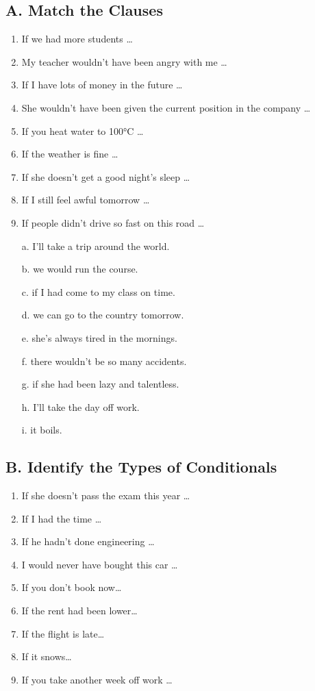 \subsection*{A. Match the Clauses}
\begin{enumerate}
      \item If we had more students …
      \item My teacher wouldn’t have been angry with me …
      \item If I have lots of money in the future …
      \item She wouldn’t have been given the current position in the company …
      \item If you heat water to 100°C …
      \item If the weather is fine …
      \item If she doesn’t get a good night’s sleep …
      \item If I still feel awful tomorrow …
      \item If people didn’t drive so fast on this road …
\end{enumerate}

\begin{enumerate}
      \item[a.] I’ll take a trip around the world.
      \item[b.] we would run the course.
      \item[c.] if I had come to my class on time.
      \item[d.] we can go to the country tomorrow.
      \item[e.] she’s always tired in the mornings.
      \item[f.] there wouldn’t be so many accidents.
      \item[g.] if she had been lazy and talentless.
      \item[h.] I’ll take the day off work.
      \item[i.] it boils.
\end{enumerate}

\subsection*{B. Identify the Types of Conditionals}

\begin{enumerate}
      \item If she doesn’t pass the exam this year …
      \item If I had the time …
      \item If he hadn’t done engineering …
      \item I would never have bought this car …
      \item If you don’t book now…
      \item If the rent had been lower…
      \item If the flight is late…
      \item If it snows…
      \item If you take another week off work …
\end{enumerate}

